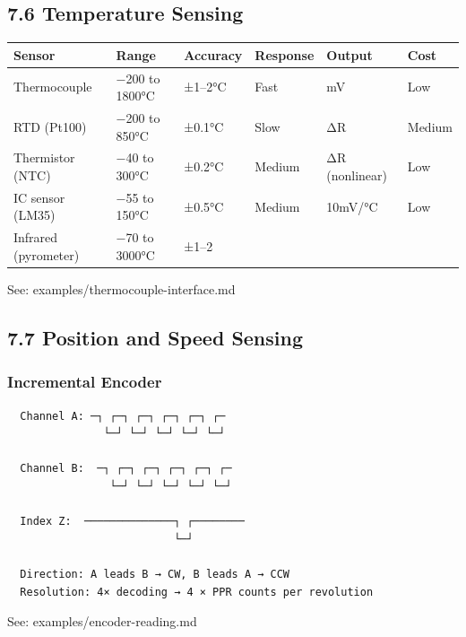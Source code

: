 \documentclass[11pt,a4paper]{book}
\begin{document}
\medskip\noindent\hrulefill\medskip

\subsection{7.6 Temperature Sensing}

\begin{center}
\begin{tabular}{|l|l|l|l|l|l|}
\hline
Sensor & Range & Accuracy & Response & Output & Cost \\
\hline
Thermocouple & −200 to 1800°C & ±1–2°C & Fast & mV & Low \\
RTD (Pt100) & −200 to 850°C & ±0.1°C & Slow & ΔR & Medium \\
Thermistor (NTC) & −40 to 300°C & ±0.2°C & Medium & ΔR (nonlinear) & Low \\
IC sensor (LM35) & −55 to 150°C & ±0.5°C & Medium & 10mV/°C & Low \\
Infrared (pyrometer) & −70 to 3000°C & ±1–2%
\hline
\end{tabular}
\end{center}

See: examples/thermocouple-interface.md

\medskip\noindent\hrulefill\medskip

\subsection{7.7 Position and Speed Sensing}

\subsubsection{Incremental Encoder}

\begin{lstlisting}
  Channel A: ─┐ ┌─┐ ┌─┐ ┌─┐ ┌─┐ ┌─
               └─┘ └─┘ └─┘ └─┘ └─┘
               
  Channel B:  ─┐ ┌─┐ ┌─┐ ┌─┐ ┌─┐ ┌─
                └─┘ └─┘ └─┘ └─┘ └─┘
                  
  Index Z:  ──────────────┐ ┌────────
                          └─┘
  
  Direction: A leads B → CW, B leads A → CCW
  Resolution: 4× decoding → 4 × PPR counts per revolution
\end{lstlisting}

See: examples/encoder-reading.md

\medskip\noindent\hrulefill\medskip
\end{document}
